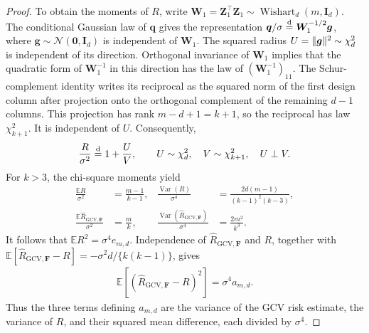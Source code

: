 \documentclass{article}
\theoremstyle{plain}
\theoremstyle{definition}
\theoremstyle{definition}
\newcommand{\boldzero}{\mathbf{0}}
\DeclarePairedDelimiter\norm{\lVert}{\rVert}
\def\E{{\mathbb{E}}}
\def\mathbold{\boldsymbol}
\def\cal{\mathcal}
\def\bF{\mathbold{F}}\def\calF{{\cal F}}\def\scrF{{\mathscr F}}\def\Fhat{\widehat{F}}\def\Ftil{{\widetilde F}}
\def\bg{\mathbold{g}}\def\ghat{\widehat{g}}\def\gtil{\widetilde{g}}
\def\bI{\mathbold{I}}\def\hbI{{\widehat{\bI}}}\def\tbI{{\widetilde{\bI}}}
\def\calN{{\cal N}}\def\scrN{{\mathscr N}}\def\Nhat{\widehat{N}}\def\Ntil{{\widetilde N}}\def\Nbar{{\overline N}}
\def\bq{\mathbold{q}}\def\qhat{\widehat{q}}\def\qtil{\widetilde{q}}\def\qbar{{\overline q}}
\def\bW{\mathbold{W}}\def\hbW{{\widehat{\bW}}}\def\tbW{{\widetilde{\bW}}}
\def\bZ{\mathbold{Z}}\def\hbZ{{\widehat{\bZ}}}\def\tbZ{{\widetilde{\bZ}}}
\newcommand{\GCV}{{\text{GCV}}}
\newcommand{\hR}{\hat{R}}
\begin{document}
\begin{proof}
To obtain the moments of $R$, write
$\bW_1=\bZ_1^\top\bZ_1\sim\operatorname{Wishart}_d(m,\bI_d)$.
The conditional Gaussian law of $\bq$ gives the representation
$\bq/\sigma\stackrel{\rm d}{=}\bW_1^{-1/2}\bg$, where
$\bg\sim\calN(\boldzero,\bI_d)$ is independent of $\bW_1$.
The squared radius $U=\norm{\bg}^2\sim\chi^2_d$ is independent of its
direction. Orthogonal invariance of $\bW_1$ implies that the quadratic
form of $\bW_1^{-1}$ in this direction has the law of
$(\bW_1^{-1})_{11}$. The Schur-complement identity writes its reciprocal
as the squared norm of the first design column after projection onto the
orthogonal complement of the remaining $d-1$ columns. This projection has
rank $m-d+1=k+1$, so the reciprocal has law $\chi^2_{k+1}$.
It is independent of $U$. Consequently,
\begin{align*}
    \frac{R}{\sigma^2}\stackrel{\rm d}{=}1+\frac UV,
    \qquad U\sim\chi^2_d,\quad V\sim\chi^2_{k+1},
    \quad U\perp V.
\end{align*}
For $k>3$, the chi-square moments yield
\begin{align*}
    \frac{\E R}{\sigma^2}&=\frac{m-1}{k-1},
    &\frac{\operatorname{Var}(R)}{\sigma^4}
       &=\frac{2d(m-1)}{(k-1)^2(k-3)},\\
    \frac{\E\hR_{\GCV,\bF}}{\sigma^2}&=\frac mk,
    &\frac{\operatorname{Var}(\hR_{\GCV,\bF})}{\sigma^4}
       &=\frac{2m^2}{k^3}.
\end{align*}
It follows that $\E R^2=\sigma^4e_{m,d}$. Independence of
$\hR_{\GCV,\bF}$ and $R$, together with
$\E[\hR_{\GCV,\bF}-R]=-\sigma^2d/\{k(k-1)\}$, gives
\begin{align*}
    \E[(\hR_{\GCV,\bF}-R)^2]=\sigma^4a_{m,d}.
\end{align*}
Thus the three terms defining $a_{m,d}$ are the variance of the GCV risk
estimate, the variance of $R$, and their squared mean difference, each
divided by $\sigma^4$.


\end{proof}
\end{document}
